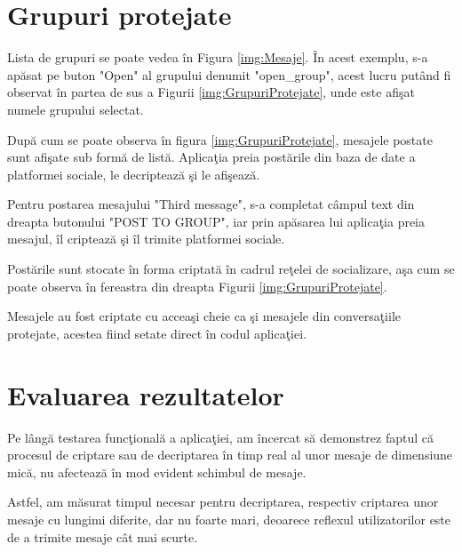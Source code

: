\section{Grupuri protejate}

Lista de grupuri se poate vedea \^{i}n Figura \ref{img:Mesaje}. \^{I}n acest exemplu, s-a ap\u{a}sat pe buton "Open" al grupului denumit "open_group", acest lucru put\^{a}nd fi observat \^{i}n partea de sus a Figurii \ref{img:GrupuriProtejate}, unde este afi\c{s}at numele grupului selectat.

Dup\u{a} cum se poate observa \^{i}n figura \ref{img:GrupuriProtejate}, mesajele postate sunt afi\c{s}ate sub form\u{a} de list\u{a}. Aplica\c{t}ia preia post\u{a}rile din baza de date a platformei sociale, le decripteaz\u{a} \c{s}i le afi\c{s}eaz\u{a}.

Pentru postarea mesajului "Third message", s-a completat c\^{a}mpul text din dreapta butonului "POST TO GROUP", iar prin ap\u{a}sarea lui aplica\c{t}ia preia mesajul, \^{i}l cripteaz\u{a} \c{s}i \^{i}l trimite platformei sociale.

Post\u{a}rile sunt stocate \^{i}n forma criptat\u{a} \^{i}n cadrul re\c{t}elei de socializare, a\c{s}a cum se poate observa \^{i}n fereastra din dreapta Figurii \ref{img:GrupuriProtejate}.

Mesajele au fost criptate cu accea\c{s}i cheie ca \c{s}i mesajele din conversa\c{t}iile protejate, acestea fiind setate direct \^{i}n codul aplica\c{t}iei.


\section{Evaluarea rezultatelor}

Pe l\^{a}ng\u{a} testarea func\c{t}ional\u{a} a aplica\c{t}iei, am \^{i}ncercat s\u{a} demonstrez faptul c\u{a} procesul de criptare sau de decriptarea \^{i}n timp real al unor mesaje de dimensiune mic\u{a}, nu afecteaz\u{a} \^{i}n mod evident schimbul de mesaje.

Astfel, am m\u{a}surat timpul necesar pentru decriptarea, respectiv criptarea unor mesaje cu lungimi diferite, dar nu foarte mari, deoarece reflexul utilizatorilor este de a trimite mesaje c\^{a}t mai scurte.

